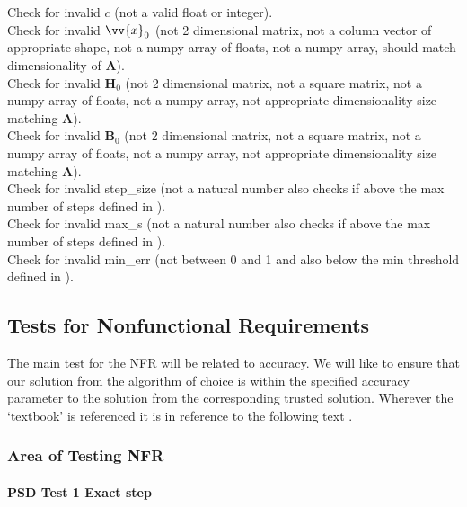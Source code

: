 \documentclass[12pt, titlepage]{article}
\begin{document}
\begin{enumerate}
\noindent Check for invalid $c$ (not a valid float or integer).
\\

\noindent Check for invalid $\vv{x}_0$ (not 2 dimensional matrix, not a column vector of appropriate shape, not a numpy array of floats, not a numpy array, should match dimensionality of $\mathbf{A}$).
\\

\noindent Check for invalid $\mathbf{H}_0$ (not 2 dimensional matrix, not a square matrix, not a numpy array of floats, not a numpy array, not appropriate dimensionality size matching $\mathbf{A}$).  
\\

\noindent Check for invalid $\mathbf{B}_0$ (not 2 dimensional matrix, not a square matrix, not a numpy array of floats, not a numpy array, not appropriate dimensionality size matching $\mathbf{A}$).  
\\

\noindent Check for invalid step\_size (not a natural number also checks if above the max number of steps defined in \citep{SRS}).  
\\

\noindent Check for invalid max\_s (not a natural number also checks if above the max number of steps defined in \citep{SRS}).  
\\

\noindent Check for invalid min\_err (not between 0 and 1 and also below the min threshold defined in \citep{SRS}).  
\\

\end{enumerate}

\subsection{Tests for Nonfunctional Requirements}
The main test for the NFR will be related to accuracy. We will like to ensure that 
our solution from the algorithm of choice is within the specified accuracy parameter 
to the solution from the corresponding trusted solution. Wherever the `textbook' is referenced it is in reference to the following text \citep{Boyd2006}.

\subsubsection{Area of Testing NFR}
		
\paragraph{PSD Test 1 Exact step }
\end{document}
